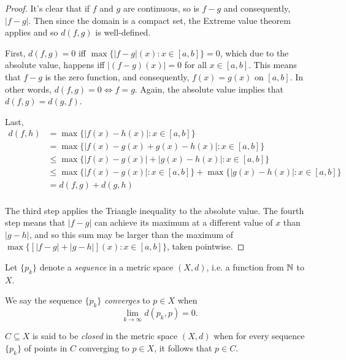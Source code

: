 \documentclass[letterpaper, twoside, 12pt]{book}
\begin{document}
\begin{proof}
    It's clear that if \(f\) and \(g\) are continuous, so is
    \(f - g\) and consequently, \(|f - g|\). Then since the domain is a compact
    set, the Extreme value theorem applies and so \(d(f, g)\) is well-defined.

    First, \(d(f, g) = 0\) iff \(\max\{|f - g|(x) : x \in [a,b]\} = 0\), which
    due to the absolute value, happens iff \(|(f - g)(x)| = 0\) for all \(x \in [a,b]\).
    This means that \(f - g\) is the zero function, and consequently,
    \(f(x) = g(x)\) on \([a,b]\). In other words, \(d(f, g) = 0 \Leftrightarrow f = g\).
    Again, the absolute value implies that \(d(f,g) = d(g, f)\).

    Last,
    \begin{align*} 
        d(f, h) &= \max\{ |f(x) - h(x)| : x \in [a,b] \} \\
                &= \max\{ |f(x) - g(x) + g(x) - h(x)| : x \in [a,b] \} \\
                &\leq \max\{ |f(x) - g(x)| + |g(x) - h(x)| : x \in [a,b] \} \\
                &\leq \max\{ |f(x) - g(x)| : x \in [a, b] \} + \max\{ |g(x) - h(x)| : x \in [a,b] \} \\
                &= d(f, g) + d(g, h) \\
    \end{align*}

    The third step applies the Triangle inequality to the absolute value. The
    fourth step means that \(|f - g|\) can achieve its maximum at a different value
    of \(x\) than \(|g - h|\), and so this sum may be larger than the maximum of 
    \(\max\{ [|f - g| + |g - h|](x) : x \in [a,b] \} \), taken pointwise.

\end{proof} 

\begin{definition}
  Let \(\{p_k\}\) denote a \textit{sequence} in a metric space \((X,d)\),
  i.e. a function from \(\mathbb N\) to \(X\).
\end{definition}

\begin{definition}
  We say the sequence \(\{p_k\}\) \textit{converges} to \(p\in X\)
  when \[\lim_{k\to\infty}d(p_k,p)=0.\]
\end{definition}

\begin{definition}
  \(C\subseteq X\) is said to be \textit{closed} in the metric space
  \((X,d)\) when for every sequence \(\{p_k\}\) of points in \(C\)
  converging to \(p\in X\), it follows that \(p\in C\).
\end{definition}
\end{document}
